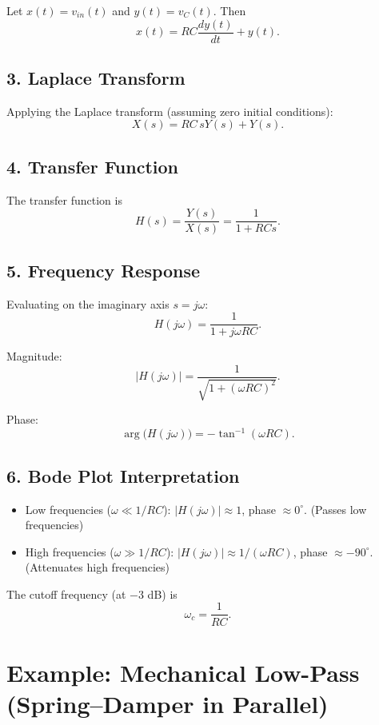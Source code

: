 \documentclass[a4paper,12pt]{article}
\begin{document}
	Let $x(t) = v_{in}(t)$ and $y(t) = v_{C}(t)$. Then
	$$
	x(t) = RC \frac{dy(t)}{dt} + y(t).
	$$
	
	\subsection*{3. Laplace Transform}
	
	Applying the Laplace transform (assuming zero initial conditions):
	$$
	X(s) = RC \, s Y(s) + Y(s).
	$$
	
	\subsection*{4. Transfer Function}
	
	The transfer function is
	$$
	H(s) = \frac{Y(s)}{X(s)} = \frac{1}{1 + RCs}.
	$$
	
	\subsection*{5. Frequency Response}
	
	Evaluating on the imaginary axis $s=j\omega$:
	$$
	H(j\omega) = \frac{1}{1 + j \omega RC}.
	$$
	
	Magnitude:
	$$
	|H(j\omega)| = \frac{1}{\sqrt{1 + (\omega RC)^2}}.
	$$
	
	Phase:
	$$
	\arg \big( H(j\omega) \big) = -\tan^{-1}(\omega RC).
	$$
	
	\subsection*{6. Bode Plot Interpretation}
	
	\begin{itemize}
		\item Low frequencies ($\omega \ll 1/RC$): 
		$|H(j\omega)| \approx 1$, phase $\approx 0^\circ$. 
		\hfill (Passes low frequencies)
		\item High frequencies ($\omega \gg 1/RC$): 
		$|H(j\omega)| \approx 1/(\omega RC)$, phase $\approx -90^\circ$. 
		\hfill (Attenuates high frequencies)
	\end{itemize}
	
	The cutoff frequency (at $-3$ dB) is
	$$
	\omega_c = \frac{1}{RC}.
	$$
	
	\section*{Example: Mechanical Low-Pass (Spring--Damper in Parallel)}
	
\end{document}
